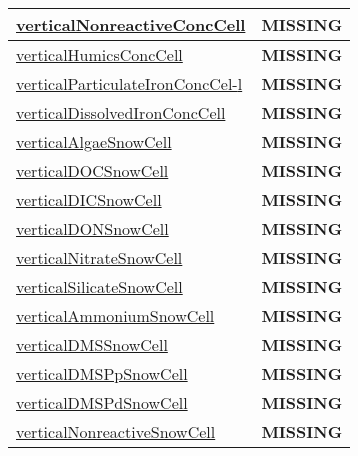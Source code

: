 {\begin{center}
\begin{longtable}{| p{2.0in} | p{4.0in} |}
    \hline
    \hyperref[subsec:var_sec_tracers_aggregate_verticalNonreactiveConcCell]{verticalNonreactiveConcCell} & {\bf \color{red} MISSING} \\
    \hline
    \hyperref[subsec:var_sec_tracers_aggregate_verticalHumicsConcCell]{verticalHumicsConcCell} & {\bf \color{red} MISSING} \\
    \hline
    \hyperref[subsec:var_sec_tracers_aggregate_verticalParticulateIronConcCell]{verticalParticulateIronConcCel-}\hyperref[subsec:var_sec_tracers_aggregate_verticalParticulateIronConcCell]{l  }& {\bf \color{red} MISSING} \\
    \hline
    \hyperref[subsec:var_sec_tracers_aggregate_verticalDissolvedIronConcCell]{verticalDissolvedIronConcCell} & {\bf \color{red} MISSING} \\
    \hline
    \hyperref[subsec:var_sec_tracers_aggregate_verticalAlgaeSnowCell]{verticalAlgaeSnowCell} & {\bf \color{red} MISSING} \\
    \hline
    \hyperref[subsec:var_sec_tracers_aggregate_verticalDOCSnowCell]{verticalDOCSnowCell} & {\bf \color{red} MISSING} \\
    \hline
    \hyperref[subsec:var_sec_tracers_aggregate_verticalDICSnowCell]{verticalDICSnowCell} & {\bf \color{red} MISSING} \\
    \hline
    \hyperref[subsec:var_sec_tracers_aggregate_verticalDONSnowCell]{verticalDONSnowCell} & {\bf \color{red} MISSING} \\
    \hline
    \hyperref[subsec:var_sec_tracers_aggregate_verticalNitrateSnowCell]{verticalNitrateSnowCell} & {\bf \color{red} MISSING} \\
    \hline
    \hyperref[subsec:var_sec_tracers_aggregate_verticalSilicateSnowCell]{verticalSilicateSnowCell} & {\bf \color{red} MISSING} \\
    \hline
    \hyperref[subsec:var_sec_tracers_aggregate_verticalAmmoniumSnowCell]{verticalAmmoniumSnowCell} & {\bf \color{red} MISSING} \\
    \hline
    \hyperref[subsec:var_sec_tracers_aggregate_verticalDMSSnowCell]{verticalDMSSnowCell} & {\bf \color{red} MISSING} \\
    \hline
    \hyperref[subsec:var_sec_tracers_aggregate_verticalDMSPpSnowCell]{verticalDMSPpSnowCell} & {\bf \color{red} MISSING} \\
    \hline
    \hyperref[subsec:var_sec_tracers_aggregate_verticalDMSPdSnowCell]{verticalDMSPdSnowCell} & {\bf \color{red} MISSING} \\
    \hline
    \hyperref[subsec:var_sec_tracers_aggregate_verticalNonreactiveSnowCell]{verticalNonreactiveSnowCell} & {\bf \color{red} MISSING} \\

\end{longtable}
\end{center}}
